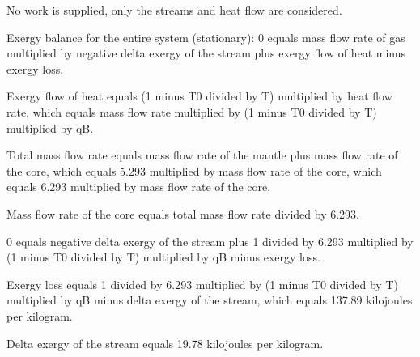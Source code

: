 No work is supplied, only the streams and heat flow are considered.  

Exergy balance for the entire system (stationary):  
0 equals mass flow rate of gas multiplied by negative delta exergy of the stream plus exergy flow of heat minus exergy loss.  

Exergy flow of heat equals (1 minus T0 divided by T) multiplied by heat flow rate, which equals mass flow rate multiplied by (1 minus T0 divided by T) multiplied by qB.  

Total mass flow rate equals mass flow rate of the mantle plus mass flow rate of the core, which equals 5.293 multiplied by mass flow rate of the core, which equals 6.293 multiplied by mass flow rate of the core.  

Mass flow rate of the core equals total mass flow rate divided by 6.293.  

0 equals negative delta exergy of the stream plus 1 divided by 6.293 multiplied by (1 minus T0 divided by T) multiplied by qB minus exergy loss.  

Exergy loss equals 1 divided by 6.293 multiplied by (1 minus T0 divided by T) multiplied by qB minus delta exergy of the stream, which equals 137.89 kilojoules per kilogram.  

Delta exergy of the stream equals 19.78 kilojoules per kilogram.